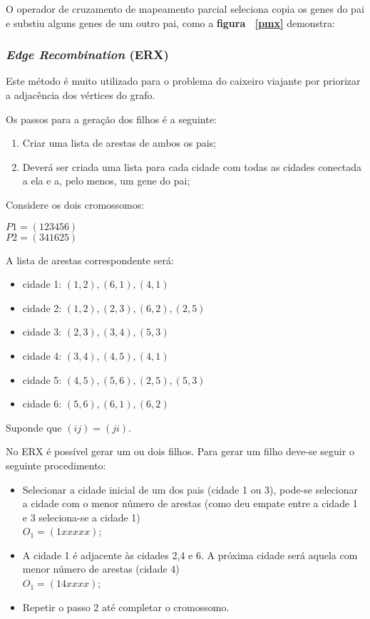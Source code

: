 \documentclass{abnt}
\begin{document}
			O operador de cruzamento de mapeamento parcial seleciona copia os genes do pai e substiu alguns genes de um outro pai, como a \textbf{figura ~\ref{pmx}} demonstra:


		\subsubsection{\textit{Edge Recombination} (ERX)}

			Este método é muito utilizado para o problema do caixeiro viajante por priorizar a adjacência dos vértices do grafo.

			Os passos para a geração dos filhos é a seguinte:

			\begin{enumerate}
				\item Criar uma lista de arestas de ambos os pais;
				\item Deverá ser criada uma lista para cada cidade com todas as cidades conectada a ela e a, pelo menos, um gene do pai;
			\end{enumerate}

			Considere os dois cromossomos:

			\begin{center}
			$ P1 = (123456)$ \\
			$ P2 = (341625)$
			\end{center}

			A lista de arestas correspondente será:

			\begin{itemize}
				\item cidade 1: $(1, 2), (6, 1), (4, 1)$
				\item cidade 2: $(1, 2), (2, 3), (6, 2), (2, 5)$
				\item cidade 3: $(2, 3), (3, 4), (5, 3)$
				\item cidade 4: $(3, 4), (4, 5), (4, 1)$
				\item cidade 5: $(4, 5), (5, 6), (2, 5), (5, 3)$
				\item cidade 6: $(5, 6), (6, 1), (6, 2)$
			\end{itemize}

		Suponde que $(ij) = (ji)$.

		No ERX é possível gerar um ou dois filhos. Para gerar um filho deve-se seguir o seguinte procedimento:
		\begin{itemize}
			\item Selecionar a cidade inicial de um dos pais (cidade 1 ou 3), pode-se selecionar a cidade com o menor número de arestas (como deu empate entre a cidade 1 e 3 seleciona-se a cidade 1)\\ $O_1=(1 x x x x x)$;

			\item A cidade 1 é adjacente às cidades 2,4 e 6. A próxima cidade será aquela com menor número de arestas (cidade 4)\\ $O_1=(1 4 x x x x)$;
			\item Repetir o passo 2 até completar o cromossomo.
		\end{itemize}
\end{document}
